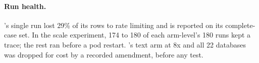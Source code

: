 \ifextended
\paragraph{Run health.} \mDS{}'s single run lost 29\% of its rows to rate
limiting and is reported on its complete-case set. In the scale
experiment, 174 to 180 of each arm-level's 180 runs kept a trace; the rest ran before a pod
restart. \mSol{}'s text arm at 8x and all 22 databases was dropped for
cost by a recorded amendment, before any test.
\fi
